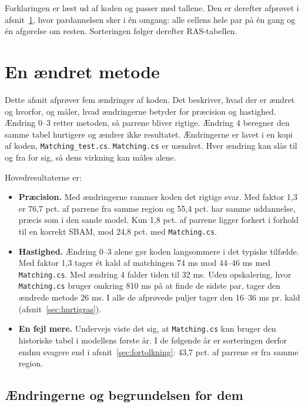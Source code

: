 \documentclass[11pt,a4paper]{article}
\newcommand{\kode}[1]{\texttt{#1}}
\begin{document}
Forklaringen er læst ud af koden og passer med tallene. Den er derefter afprøvet i
afsnit~\ref{sec:nymetode}, hvor pardannelsen sker i én omgang: alle cellens hele par på én gang og én
afgørelse om resten. Sorteringen følger derefter RAS-tabellen.


\section{En ændret metode}\label{sec:nymetode}

Dette afsnit afprøver fem ændringer af koden. Det beskriver, hvad der er ændret og hvorfor, og
måler, hvad ændringerne betyder for præcision og hastighed. Ændring 0--3 retter metoden, så parrene
bliver rigtige. Ændring 4 beregner den samme tabel hurtigere og ændrer ikke resultatet. Ændringerne
er lavet i en kopi af koden, \kode{Matching\_test.cs}. \kode{Matching.cs} er uændret. Hver ændring
kan slås til og fra for sig, så dens virkning kan måles alene.

Hovedresultaterne er:

\begin{itemize}
\item \textbf{Præcision.} Med ændringerne rammer koden det rigtige svar. Med faktor 1,3 er 76,7 pct.
af parrene fra samme region og 55,4 pct. har samme uddannelse, præcis som i den sande model. Kun
1,8 pct. af parrene ligger forkert i forhold til en korrekt SBAM, mod 24,8 pct. med
\kode{Matching.cs}.
\item \textbf{Hastighed.} Ændring 0--3 alene gør koden langsommere i det typiske tilfælde. Med faktor
1,3 tager ét kald af matchingen 74 ms mod 44--46 ms med \kode{Matching.cs}. Med ændring 4 falder
tiden til 32 ms. Uden opskalering, hvor \kode{Matching.cs} bruger omkring 810 ms på at finde de
sidste par, tager den ændrede metode 26 ms. I alle de afprøvede puljer tager den 16--36 ms pr. kald
(afsnit~\ref{sec:hurtigras}).
\item \textbf{En fejl mere.} Undervejs viste det sig, at \kode{Matching.cs} kun bruger den historiske
tabel i modellens første år. I de følgende år er sorteringen derfor endnu svagere end i
afsnit~\ref{sec:fortolkning}: 43,7 pct. af parrene er fra samme region.
\end{itemize}

\subsection{Ændringerne og begrundelsen for dem}\label{sec:aendringer}
\end{document}
